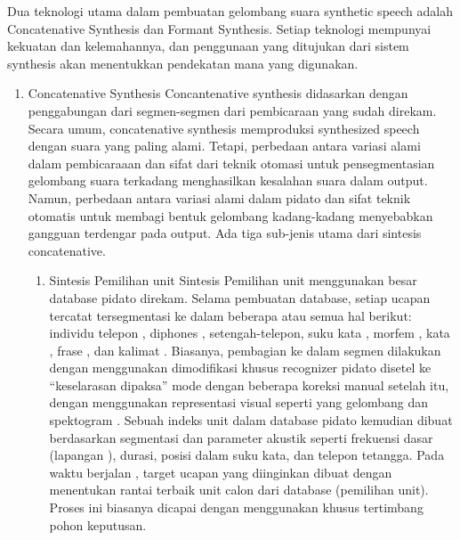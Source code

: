 Dua teknologi utama dalam pembuatan gelombang suara synthetic speech adalah Concatenative Synthesis dan Formant Synthesis. Setiap teknologi mempunyai kekuatan dan kelemahannya, dan penggunaan yang ditujukan dari sistem synthesis akan menentukkan pendekatan mana yang digunakan.

\begin{enumerate}
\item Concatenative Synthesis
Concantenative synthesis didasarkan dengan penggabungan dari segmen-segmen dari pembicaraan yang sudah direkam. Secara umum, concatenative synthesis memproduksi synthesized speech dengan suara yang paling alami. Tetapi, perbedaan antara variasi alami dalam pembicaraaan dan sifat dari teknik otomasi untuk pensegmentasian gelombang suara terkadang menghasilkan kesalahan suara dalam output. Namun, perbedaan antara variasi alami dalam pidato dan sifat teknik otomatis untuk membagi bentuk gelombang kadang-kadang menyebabkan gangguan terdengar pada output. Ada tiga sub-jenis utama dari sintesis concatenative.
\begin{enumerate}
\item Sintesis Pemilihan unit
Sintesis Pemilihan unit menggunakan besar database pidato direkam. Selama pembuatan database, setiap ucapan tercatat tersegmentasi ke dalam beberapa atau semua hal berikut: individu telepon , diphones , setengah-telepon, suku kata , morfem , kata , frase , dan kalimat . Biasanya, pembagian ke dalam segmen dilakukan dengan menggunakan dimodifikasi khusus recognizer pidato disetel ke “keselarasan dipaksa” mode dengan beberapa koreksi manual setelah itu, dengan menggunakan representasi visual seperti yang gelombang dan spektogram .  Sebuah indeks unit dalam database pidato kemudian dibuat berdasarkan segmentasi dan parameter akustik seperti frekuensi dasar (lapangan ), durasi, posisi dalam suku kata, dan telepon tetangga. Pada waktu berjalan , target ucapan yang diinginkan dibuat dengan menentukan rantai terbaik unit calon dari database (pemilihan unit). Proses ini biasanya dicapai dengan menggunakan khusus tertimbang pohon keputusan.


\end{enumerate}
\end{enumerate}
